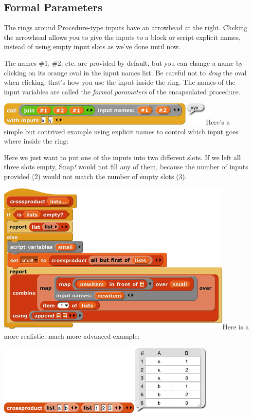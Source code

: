 \subsection{Formal Parameters}\label{formal-parameters}

The rings around Procedure-type inputs have an arrowhead at the right.
Clicking the arrowhead allows you to give the inputs to a block or
script explicit names, instead of using empty input slots as we've done
until now.

The names \#1, \#2, etc. are provided by default, but you can change a
name by clicking on its orange oval in the input names list. Be careful
not to \emph{drag} the oval when clicking; that's how you use the input
inside the ring. The names of the input variables are called the
\emph{formal parameters} of the encapsulated procedure.

\includegraphics[width=4.32292in,height=0.45417in]{media/image731.png}Here's
a simple but contrived example using explicit names to control which
input goes where inside the ring:

Here we just want to put one of the inputs into two different slots. If
we left all three slots empty, Snap\emph{!} would not fill any of them,
because the number of inputs provided (2) would not match the number of
empty slots (3).

\includegraphics[width=4.67986in,height=3.01806in]{media/image732.png}Here
is a more realistic, much more advanced example:

\includegraphics[width=4.34722in,height=1.40278in]{media/image733.png}

